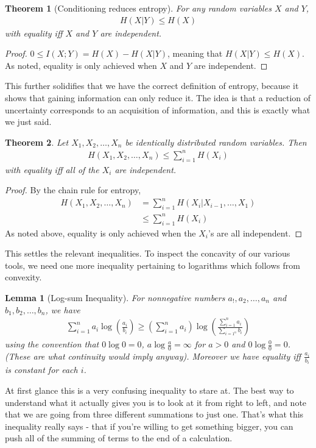 \documentclass{article}
\theoremstyle{definition}
\theoremstyle{plain}
\newtheorem{lemma}{Lemma}[section]
\newtheorem{theorem}{Theorem}[section]
\begin{document}
\begin{theorem}[Conditioning reduces entropy]
	For any random variables $X$ and $Y$, 
\begin{align}
	H(X|Y) \leq H(X)
\end{align}
with equality iff $X$ and $Y$ are independent. 
\end{theorem}
\begin{proof}
	$0 \leq I(X;Y) = H(X) - H(X|Y)$, meaning that $H(X|Y) \leq H(X)$. As noted, equality is only achieved when $X$ and $Y$ are independent.
\end{proof}
This further solidifies that we have the correct definition of entropy, because it shows that gaining information can only reduce it. The idea is that a reduction of uncertainty corresponds to an acquisition of information, and this is exactly what we just said. 
\begin{theorem}
	Let $X_1,X_2,\ldots,X_n$ be identically distributed random variables. Then
\begin{align}
	H(X_1,X_2,\ldots,X_n) \leq \sum_{i=1}^n H(X_i)
\end{align}
 with equality iff all of the $X_i$ are independent.
\end{theorem}
\begin{proof}
	By the chain rule for entropy, 
\begin{align}
	H(X_1,X_2,\ldots,X_n) &= \sum_{i=1}^n H(X_i|X_{i-1},\ldots,X_1) \\
		&\leq \sum_{i=1}^n H(X_i)
\end{align}
As noted above, equality is only achieved when the $X_i$'s are all independent. 
\end{proof}
This settles the relevant inequalities. To inspect the concavity of our various tools, we need one more inequality pertaining to logarithms which follows from convexity.
\begin{lemma}[Log-sum Inequality]
 For nonnegative numbers $a_!,a_2,\ldots,a_n$ and $b_1,b_2,\ldots,b_n$, we have
 \begin{align}
 	\sum_{i=1}^n a_i\log\left(\frac{a_i}{b_i}\right) \geq \left(\sum_{i=1}^n a_i\right)\log\left(\frac{\sum_{i=1}^n a_i}{\sum_{i=1^n}b_i}\right)
 \end{align}
 using the convention that $0\log0 = 0$, $a\log\frac{a}{0} = \infty$ for $a>0$ and $0\log\frac{0}{0} = 0$. (These are what continuity would imply anyway). Moreover we have equality iff $\frac{a_i}{b_i}$ is constant for each $i$. 
\end{lemma}
At first glance this is a very confusing inequality to stare at. The best way to understand what it actually gives you is to look at it from right to left, and note that we are going from three different summations to just one. That's what this inequality really says - that if you're willing to get something bigger, you can push all of the summing of terms to the end of a calculation.
\end{document}
